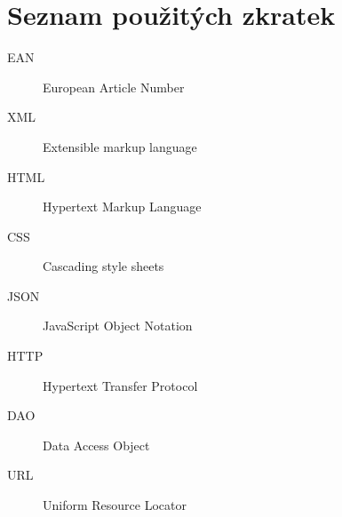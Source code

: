 \documentclass[thesis=B,czech]{FITthesis}[2012/06/26]
\begin{document}
\chapter{Seznam použitých zkratek}
\begin{description}
	\item[EAN] European Article Number
	\item[XML] Extensible markup language
	\item[HTML] Hypertext Markup Language
	\item[CSS] Cascading style sheets
	\item[JSON] JavaScript Object Notation
	\item[HTTP] Hypertext Transfer Protocol
	\item[DAO] Data Access Object
	\item[URL] Uniform Resource Locator

\end{description}
\end{document}
